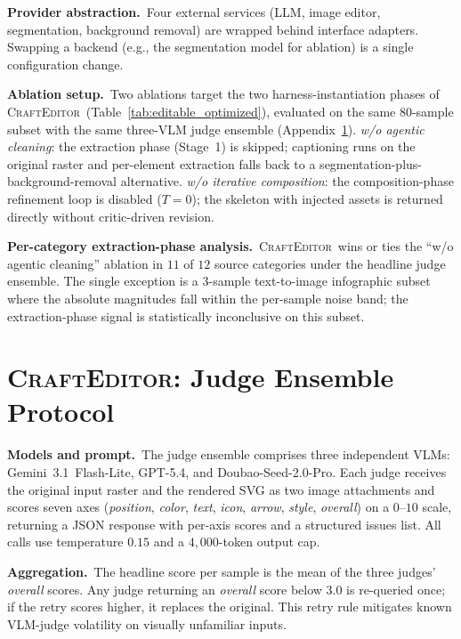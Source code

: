 \documentclass{article}
\newcommand{\Editor}{\textsc{CraftEditor}\xspace}
\begin{document}
\noindent\textbf{Provider abstraction.}\ 
Four external services (LLM, image editor, segmentation, background
removal) are wrapped behind interface adapters.
Swapping a backend (e.g., the segmentation model for ablation) is a
single configuration change.

\noindent\textbf{Ablation setup.}\ 
Two ablations target the two harness-instantiation phases of
\Editor\ (Table~\ref{tab:editable_optimized}), evaluated on the
same $80$-sample subset with the same three-VLM judge ensemble
(Appendix~\ref{app:editor-judge}).
\emph{w/o agentic cleaning}: the extraction phase (Stage~1) is
skipped; captioning runs on the original raster and per-element
extraction falls back to a segmentation-plus-background-removal
alternative.
\emph{w/o iterative composition}: the composition-phase refinement
loop is disabled ($T{=}0$); the skeleton with injected assets is
returned directly without critic-driven revision.

\noindent\textbf{Per-category extraction-phase analysis.}\ 
\Editor\ wins or ties the ``w/o agentic cleaning'' ablation in $11$
of $12$ source categories under the headline judge ensemble.
The single exception is a $3$-sample text-to-image infographic
subset where the absolute magnitudes fall within the per-sample
noise band; the extraction-phase signal is statistically
inconclusive on this subset.
\section{\Editor: Judge Ensemble Protocol}
\label{app:editor-judge}

\noindent\textbf{Models and prompt.}\
The judge ensemble comprises three independent VLMs: Gemini~3.1~Flash-Lite, GPT-5.4, and Doubao-Seed-2.0-Pro. Each judge receives the original input raster and the rendered SVG as two image attachments and scores seven axes (\emph{position}, \emph{color}, \emph{text}, \emph{icon}, \emph{arrow}, \emph{style}, \emph{overall}) on a $0$--$10$ scale, returning a JSON response with per-axis scores and a structured issues list. All calls use temperature $0.15$ and a $4{,}000$-token output cap.

\noindent\textbf{Aggregation.}\
The headline score per sample is the mean of the three judges' \emph{overall} scores. Any judge returning an \emph{overall} score below $3.0$ is re-queried once; if the retry scores higher, it replaces the original. This retry rule mitigates known VLM-judge volatility on visually unfamiliar inputs.
\end{document}
